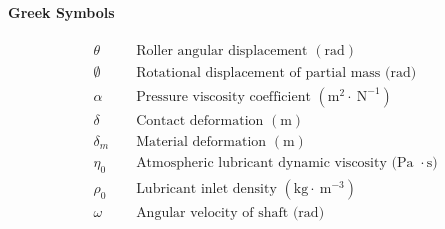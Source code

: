 \paragraph{Greek Symbols}
\begin{align*}
	&\theta && \text { Roller angular displacement }(\mathrm{rad}) \\
	&\emptyset && \text { Rotational displacement of partial mass (rad) } \\
	&\alpha && \text { Pressure viscosity coefficient }\left(\mathrm{m}^2 \cdot \mathrm{~N}^{-1}\right) \\
	&\delta && \text { Contact deformation }(\mathrm{m}) \\
	&\delta_m && \text { Material deformation }(\mathrm{m}) \\
	&\eta_0 && \text { Atmospheric lubricant dynamic viscosity (Pa } \cdot \mathrm{s}) \\
	&\rho_0 && \text { Lubricant inlet density }\left(\mathrm{kg} \cdot \mathrm{~m}^{-3}\right) \\
	&\omega && \text { Angular velocity of shaft (rad) }
\end{align*}

